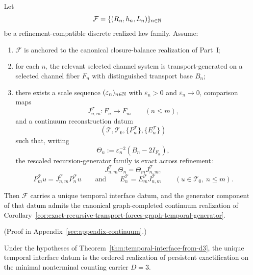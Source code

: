 \begin{theorem}
\label{thm:temporal-interface-from-d3}
Let
\[
\mathcal F=\{(R_n,h_n,L_n)\}_{n\in\mathbb{N}}
\]
be a refinement-compatible discrete realized law family. Assume:
\begin{enumerate}[label=(\roman*), leftmargin=2em, itemsep=0.2em]
\item \(\mathcal F\) is anchored to the canonical closure-balance realization
      of Part~I;
\item for each \(n\), the relevant selected channel system is
      transport-generated on a selected channel fiber \(F_n\) with
      distinguished transport base \(B_n\);
\item there exists a scale sequence \((\varepsilon_n)_{n\in\mathbb{N}}\) with
      \(\varepsilon_n>0\) and \(\varepsilon_n\to0\), comparison maps
      \[
      J^{\mathcal T}_{n,m}:F_n\to F_m
      \qquad (n\le m),
      \]
      and a continuum reconstruction datum
      \[
      (\mathcal T,\mathcal T_0,\{P_n^{\mathcal T}\},\{E_n^{\mathcal T}\})
      \]
      such that, writing
      \[
      \Theta_n:=\varepsilon_n^{-2}(B_n-2I_{F_n}),
      \]
      the rescaled recursion-generator family is exact across refinement:
      \[
      J^{\mathcal T}_{n,m}\Theta_n=\Theta_mJ^{\mathcal T}_{n,m},
      \]
      \[
      P_m^{\mathcal T}u=J^{\mathcal T}_{n,m}P_n^{\mathcal T}u
      \qquad\text{and}\qquad
      E_n^{\mathcal T}=E_m^{\mathcal T}J^{\mathcal T}_{n,m}
      \qquad (u\in\mathcal T_0,\ n\le m).
      \]
\end{enumerate}
Then \(\mathcal F\) carries a unique temporal interface datum, and the
generator component of that datum admits the canonical graph-completed
continuum realization of
Corollary~\ref{cor:exact-recursive-transport-forces-graph-temporal-generator}.
\end{theorem}

(Proof in Appendix~\ref{sec:appendix-continuum}.)

\begin{corollary}
\label{cor:persistent-exactification-yields-temporal-interface}
Under the hypotheses of
Theorem~\ref{thm:temporal-interface-from-d3}, the unique temporal interface
datum is the ordered realization of persistent exactification on the minimal
nonterminal counting carrier \(D=3\).
\end{corollary}

